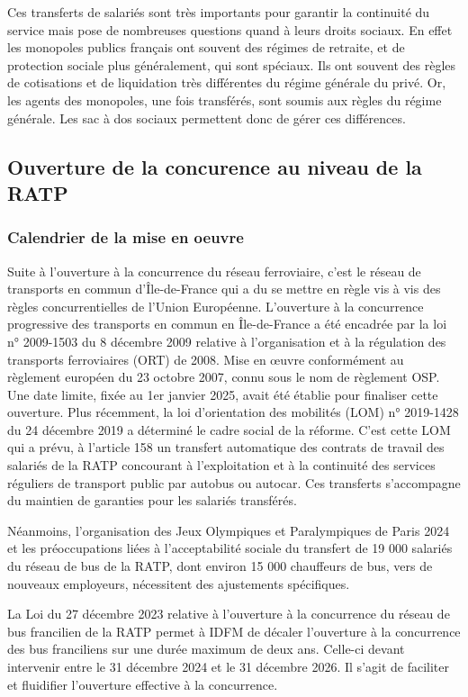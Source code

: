 Ces transferts de salariés sont très importants pour garantir la continuité du service mais pose de nombreuses questions quand à leurs droits sociaux. En effet les monopoles publics français ont souvent des régimes de retraite, et de protection sociale plus généralement, qui sont spéciaux. Ils ont souvent des règles de cotisations et de liquidation très différentes du régime générale du privé. Or, les agents des monopoles, une fois transférés, sont soumis aux règles du régime générale. Les sac à dos sociaux permettent donc de gérer ces différences.


  \subsection{Ouverture de la concurence au niveau de la RATP}

  \subsubsection{Calendrier de la mise en oeuvre}

Suite à l'ouverture à la concurrence du réseau ferroviaire, c'est le réseau de transports en commun d'Île-de-France qui a du se mettre en règle vis à vis des règles concurrentielles de l'Union Européenne.
L'ouverture à la concurrence progressive des  transports en commun en Île-de-France a été encadrée par la loi n° 2009-1503 du 8 décembre 2009 relative à l’organisation et à la régulation des transports ferroviaires (ORT) de 2008. Mise en œuvre conformément au règlement européen du 23 octobre 2007, connu sous le nom de règlement OSP. Une date limite, fixée au 1er janvier 2025, avait été établie pour finaliser cette ouverture. Plus récemment, la loi d'orientation des mobilités (LOM) n° 2019-1428 du 24 décembre 2019 a déterminé le cadre social de la réforme.
C'est cette LOM qui a prévu, à l'article 158 un transfert automatique des contrats de travail des salariés de la RATP concourant à l’exploitation et à la continuité des services réguliers de transport public par autobus ou autocar. Ces transferts s’accompagne du maintien de garanties pour les salariés transférés.

Néanmoins, l'organisation des Jeux Olympiques et Paralympiques de Paris 2024 et les préoccupations liées à l'acceptabilité sociale du transfert de 19 000 salariés du réseau de bus de la RATP, dont environ 15 000 chauffeurs de bus, vers de nouveaux employeurs, nécessitent des ajustements spécifiques.

La Loi du 27 décembre 2023 relative à l'ouverture à la concurrence du réseau de bus francilien de la RATP permet à IDFM de décaler l'ouverture à la concurrence des bus franciliens sur une durée maximum de deux ans. Celle-ci devant intervenir entre le 31 décembre 2024 et le 31 décembre 2026. Il s'agit de faciliter et fluidifier l’ouverture effective à la concurrence.

